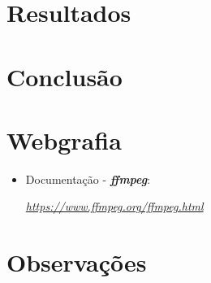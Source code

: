 \documentclass[a4paper]{report}
\begin{document}
\chapter{Resultados}
\large{

}

\chapter{Conclusão}
\large{

}

\chapter{Webgrafia}
    \begin{itemize}
        \item Documentação - \textbf{\textit{ffmpeg}}:
        \par \textit{\url{https://www.ffmpeg.org/ffmpeg.html}}
    \end{itemize}

\appendix
\chapter{Observações}
\end{document}
